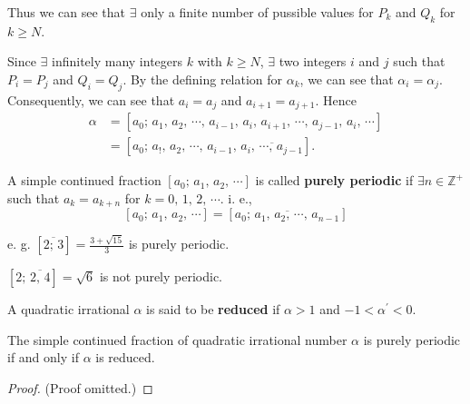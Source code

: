 Thus we can see that $\exists$ only a finite number of pussible values
for $P_k$ and $Q_k$ for $k \geq N$.

Since $\exists$ infinitely many integers $k$ with $k \geq N$, $\exists$
two integers $i$ and $j$ such that $P_i=P_j$ and $Q_i=Q_j$.
By the defining relation for $\alpha_k$, we can see that $\alpha_i=\alpha_j$.
Consequently, we can see that $a_i=a_j$ and $a_{i+1}=a_{j+1}$.
Hence
\begin{align*}
    \alpha&=\left[ a_0;\,a_1,\,a_2,\,\cdots,\,a_{i-1},\,a_i,\,a_{i+1},\,\cdots,\,a_{j-1},\,a_i,\,\cdots \right]\\
    &= \left[ a_0;\,a_!,\,a_2,\,\cdots,\,a_{i-1},\,\overline{a_i,\,\cdots,\,a_{j-1}} \right].
\end{align*}

\begin{definition}
    A simple continued fraction $\left[ a_0;\,a_1,\,a_2,\,\cdots \right]$ is
    called \textbf{purely periodic} if $\exists n \in \mathbb{Z}^+$ such that
    $a_k=a_{k+n}$ for $k=0,\,1,\,2,\,\cdots$. i. e.,
    \[
        \left[ a_0;\,a_1,\,a_2,\,\cdots \right] = \left[ \overline{a_0;\,a_1,\,a_2,\,\cdots,\,a_{n-1}} \right]
    \]
\end{definition}

e. g. $\left[ \overline{2;\,3} \right]=\frac{3+\sqrt{15}}{3}$ is purely periodic.

$\left[ 2;\,\overline{2,\,4} \right]=\sqrt{6}$ is not purely periodic.

\begin{definition}
    A quadratic irrational $\alpha$ is said to be \textbf{reduced} if
    $\alpha > 1$ and $-1 < \alpha^\prime < 0$.
\end{definition}

\begin{theorem}
    The simple continued fraction of quadratic irrational number $\alpha$
    is purely periodic if and only if $\alpha$ is reduced.
\end{theorem}

\begin{proof}
    (Proof omitted.)
\end{proof}

